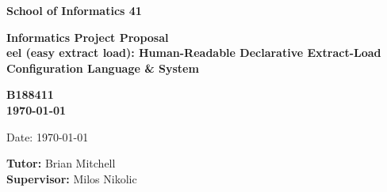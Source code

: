 \documentclass[a4paper,11pt]{article}
\newcommand{\examnumber}{B188411}
\newcommand{\field}{eel (easy extract load): Human-Readable Declarative Extract-Load Configuration Language \& System}
\newcommand{\tutor}{Brian Mitchell}
\newcommand{\supervisor}{Milos Nikolic}
\begin{document}
\begin{minipage}[b]{110mm}
    {\Huge\bf School of Informatics 41
        \vspace*{17mm}}
\end{minipage}
\hfill
\begin{minipage}[t]{40mm}
\end{minipage}
\par\noindent
\vspace*{2cm}
\begin{center}
    \Large\bf Informatics Project Proposal \\
    \Large\bf \field
\end{center}
\vspace*{1.5cm}
\begin{center}
    \bf \examnumber\\
    \monthyeardate\today
\end{center}
\vspace*{5mm}

%
%                       
\begin{abstract}
    
\end{abstract}

\vspace*{1cm}

\vspace*{3cm}
Date: \today

\vfill
{\bf Tutor:} \tutor\\
{\bf Supervisor:} \supervisor
\newpage

\setcounter{page}{1}                            %
\footruleheight{1pt}
\headruleheight{1pt}
\rhead{- \thepage}
\cfoot{}
%

\tableofcontents
\pagebreak




{\small
}
\end{document}
